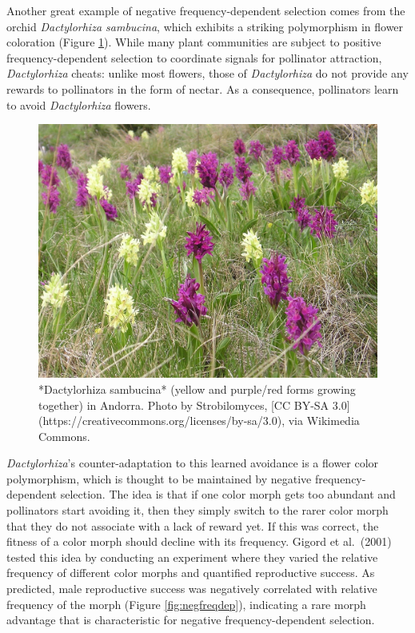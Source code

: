 \documentclass[
]{book}
\begin{document}
Another great example of negative frequency-dependent selection comes from the orchid \emph{Dactylorhiza sambucina}, which exhibits a striking polymorphism in flower coloration (Figure \ref{fig:orchid}). While many plant communities are subject to positive frequency-dependent selection to coordinate signals for pollinator attraction, \emph{Dactylorhiza} cheats: unlike most flowers, those of \emph{Dactylorhiza} do not provide any rewards to pollinators in the form of nectar. As a consequence, pollinators learn to avoid \emph{Dactylorhiza} flowers.

\begin{figure}
\includegraphics[width=1\linewidth]{images/Dactylorhiza_sambucina} \caption{*Dactylorhiza sambucina* (yellow and purple/red forms growing together) in Andorra. Photo by Strobilomyces, [CC BY-SA 3.0](https://creativecommons.org/licenses/by-sa/3.0), via Wikimedia Commons.}\label{fig:orchid}
\end{figure}

\emph{Dactylorhiza}'s counter-adaptation to this learned avoidance is a flower color polymorphism, which is thought to be maintained by negative frequency-dependent selection. The idea is that if one color morph gets too abundant and pollinators start avoiding it, then they simply switch to the rarer color morph that they do not associate with a lack of reward yet. If this was correct, the fitness of a color morph should decline with its frequency. Gigord et al.~(2001) tested this idea by conducting an experiment where they varied the relative frequency of different color morphs and quantified reproductive success. As predicted, male reproductive success was negatively correlated with relative frequency of the morph (Figure \ref{fig:negfreqdep}), indicating a rare morph advantage that is characteristic for negative frequency-dependent selection.
\end{document}
